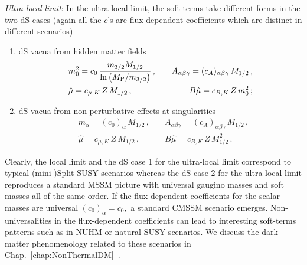 \documentclass[12pt,a4paper]{book}
\def\nn{\nonumber}
\def\nn{\nonumber}
\begin{document}
\medskip
\emph{Ultra-local limit}: In the ultra-local limit, the soft-terms take different forms in the two dS cases
(again all the $c$'s are flux-dependent coefficients which are distinct in different scenarios)
\begin{enumerate}
\item dS vacua from hidden matter fields
\begin{align}
&m_0^2 = c_{0}\,\frac{m_{3/2}M_{1/2}}{\ln\left(M_{\rm P}/m_{3/2}\right)}\,,\quad &A_{\alpha\beta\gamma} = (c_A)_{\alpha\beta\gamma}\,M_{1/2}\,, \nn \\
&\hat\mu= c_{\mu,K}\,Z\,M_{1/2}\,,\quad &B\hat\mu = c_{B,K}\,Z\,m_0^2\,;
\end{align}
\item dS vacua from non-perturbative effects at singularities
\begin{align}
&m_\alpha = (c_{0})_\alpha\,M_{1/2}\,,\quad &A_{\alpha\beta\gamma} = (c_A)_{\alpha\beta\gamma}\,M_{1/2}\,, \nn \\
&\hat\mu= c_{\mu,K}\,Z\,M_{1/2}\,,\quad &B\hat\mu = c_{B,K}\,Z\,M_{1/2}^2\,.
\end{align}
\end{enumerate}
Clearly, the local limit and the dS case 1 for the ultra-local limit correspond to typical (mini-)Split-SUSY scenarios whereas the dS case 2 for the ultra-local limit reproduces a standard MSSM picture with universal gaugino masses and soft masses all of the same order. If the flux-dependent coefficients for the scalar masses are universal $(c_0)_\alpha=c_0,$ a standard CMSSM scenario emerges. Non-universalities in the flux-dependent coefficients can lead to interesting soft-terms patterns such as in NUHM or natural SUSY scenarios. We discuss the dark matter phenomenology related to these scenarios in Chap.~\ref{chap:NonThermalDM}~\cite{Aparicio:2015sda}.\\
\end{document}
